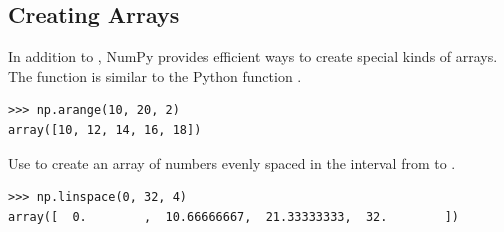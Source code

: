 \subsection*{Creating Arrays}
In addition to , NumPy provides efficient ways to create special kinds of arrays. The function  is similar to the Python function .

\begin{lstlisting}
>>> np.arange(10, 20, 2) 
array([10, 12, 14, 16, 18])
\end{lstlisting}
 
Use  to create an array of  numbers evenly spaced in the interval from  to .
\begin{lstlisting}
>>> np.linspace(0, 32, 4) 
array([  0.        ,  10.66666667,  21.33333333,  32.        ])
\end{lstlisting} 

